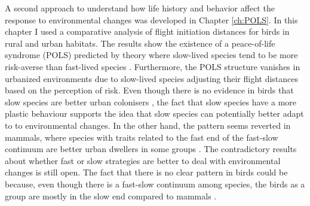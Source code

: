 A second approach to understand how life history and behavior affect the
response to environmental changes was developed in Chapter \ref{ch:POLS}. In
this chapter I used a comparative analysis of flight initiation distances for
birds in rural and urban habitats. The results show the existence of a
peace-of-life syndrome (POLS) predicted by theory where slow-lived species tend
to be more risk-averse than fast-lived species \citep{Reale2010a}.
Furthermore, the POLS structure vanishes in urbanized environments due to
slow-lived species adjusting their flight distances based on the perception of
risk. Even though there is no evidence in birds that slow species are better
urban colonisers \citep{Sol2014}, the fact that slow species have a more plastic
behaviour supports the idea that slow species can potentially better adapt to
to environmental changes.
In the other hand, the pattern seems reverted in mammals, where species with
traits related to the fast end of the fast-slow continuum are better urban
dwellers in some groups \citep{Santini2019}.
The contradictory results about whether fast or slow strategies are better to
deal with environmental changes is still open. The fact that there is no clear
pattern in birds could be because, even though there is a fast-slow continuum
among species, the birds as a group are mostly in the slow end compared to
mammals \citep{Healy2014}.

\bigskip

